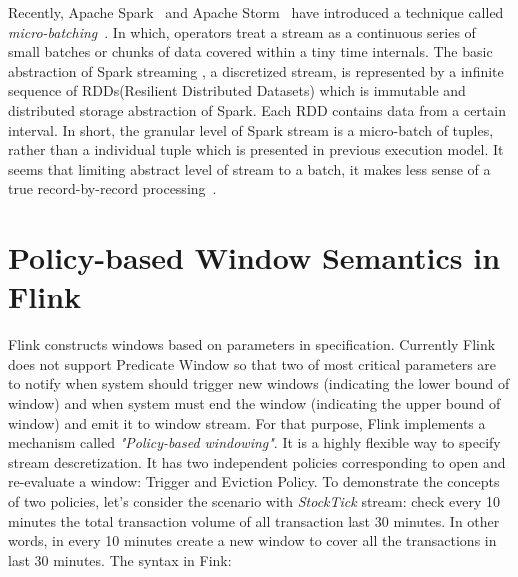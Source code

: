 

Recently, Apache Spark~\citep{spark} and Apache Storm~\citep{storm} have introduced a technique called \textit{micro-batching}~\citep{Zaharia:2012}. In which, operators treat a stream as a continuous series of small batches or chunks of data covered within a tiny time internals. The basic abstraction of Spark streaming , a discretized stream,  is represented by a infinite sequence of RDDs(Resilient Distributed Datasets) which is immutable and distributed storage abstraction of Spark. Each RDD contains data from a certain interval. In short, the granular level of Spark stream is a micro-batch of tuples, rather than a individual tuple which is presented in previous execution model. It seems that limiting abstract level of stream to a batch, it makes less sense of a true record-by-record processing~\citep{Shahrivari:2014}.


\section{Policy-based Window Semantics in Flink}


Flink constructs windows based on parameters in specification. Currently Flink does not support Predicate Window so that two of most critical parameters are to notify when system should trigger new windows (indicating the lower bound of window) and when system must end the window (indicating the upper bound of window) and emit it to window stream. For that purpose, Flink implements a mechanism called \textit{"Policy-based windowing"}. It is a highly flexible way to specify stream descretization. It has two independent policies corresponding to open and re-evaluate a window: Trigger and Eviction Policy.
To demonstrate the concepts of two policies, let's consider the scenario with \textit{StockTick} stream: check every 10 minutes the total transaction volume of all transaction last 30 minutes. In other words, in every 10 minutes create a new window to cover all the transactions in last 30 minutes. The syntax in Fink:

